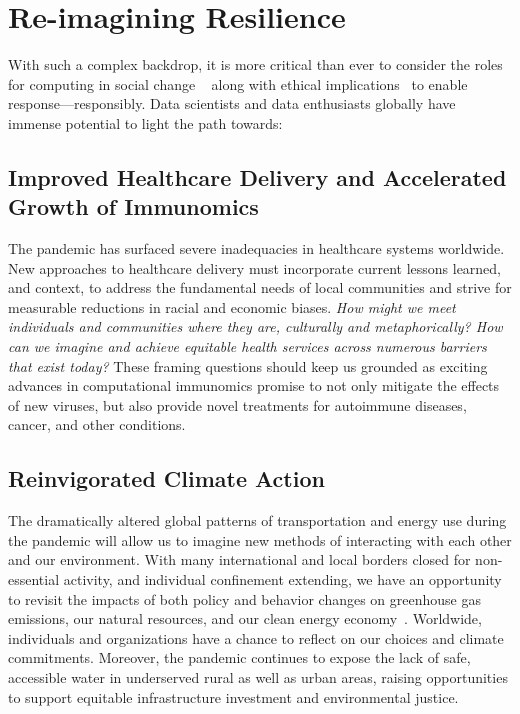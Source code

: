 \section{Re-imagining Resilience}
With such a complex backdrop, it is more critical than ever to consider the roles for computing in social change ~\cite{abebe2020roles} along with ethical implications~\cite{stoyan, gotterbarn2017acm, bloomberg, EthicalOS, Guidebook} to enable response—responsibly.  Data scientists and data enthusiasts globally have immense potential to light the path towards:

\subsection*{Improved Healthcare Delivery and Accelerated Growth of Immunomics}
The pandemic has surfaced severe inadequacies in healthcare systems worldwide. New approaches to healthcare delivery must incorporate current lessons learned, and context, to address the fundamental needs of local communities and strive for measurable reductions in racial and economic biases. \emph{How might we meet individuals and communities where they are, culturally and metaphorically? How can we imagine and achieve equitable health services across numerous barriers that exist today?} These framing questions should keep us grounded as exciting advances in computational immunomics promise to not only mitigate the effects of new viruses, but also provide novel treatments for autoimmune diseases, cancer, and other conditions. 
 
\subsection*{Reinvigorated Climate Action}
The dramatically altered global patterns of transportation and energy use during the pandemic will allow us to imagine new methods of interacting with each other and our environment. With many international and local borders closed for non-essential activity, and individual confinement extending, we have an opportunity to revisit the impacts of both policy and behavior changes on greenhouse gas emissions, our natural resources, and our clean energy economy~\cite{le2020temporary}. Worldwide, individuals and organizations have a chance to reflect on our choices and climate commitments. Moreover, the pandemic continues to expose the lack of safe, accessible water in underserved rural as well as urban areas, raising opportunities to support equitable infrastructure investment and environmental justice. 
 
